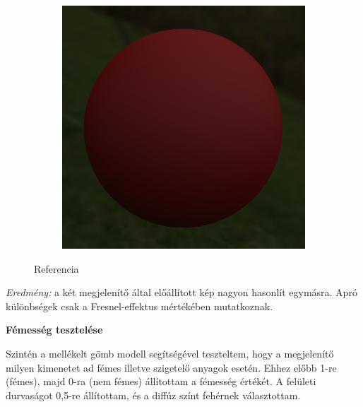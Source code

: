\begin{figure}[!ht]
\begin{subfigure}[b]{0.27\textwidth}
    \end{subfigure}
    \hfill
    \begin{subfigure}[b]{0.27\textwidth}
        \centering
        \includegraphics[width=\textwidth]{images/marmoset_r0.png}
    \end{subfigure}
    \caption{Referencia}
\end{figure}

\textit{Eredmény:} a két megjelenítő által előállított kép nagyon hasonlít egymásra. Apró különbségek csak a Fresnel-effektus mértékében mutatkoznak.

\vspace{15pt}

\textbf{Fémesség tesztelése}

Szintén a mellékelt gömb modell segítségével teszteltem, hogy a megjelenítő milyen kimenetet ad fémes illetve szigetelő anyagok esetén. Ehhez előbb 1-re (fémes), majd 0-ra (nem fémes) állítottam a fémesség értékét. A felületi durvaságot 0,5-re állítottam, és a diffúz színt fehérnek választottam.

